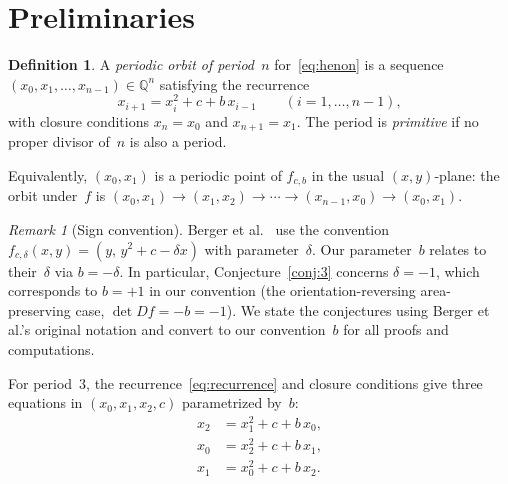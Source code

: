 \documentclass[11pt]{article}
\theoremstyle{definition}
\newtheorem{definition}[theorem]{Definition}
\theoremstyle{remark}
\newtheorem{remark}[theorem]{Remark}
\begin{document}
\section{Preliminaries}
\label{sec:prelim}

\begin{definition}\label{def:periodicorbit}
  A \emph{periodic orbit of period~$n$} for~\eqref{eq:henon} is a sequence
  $(x_0, x_1, \ldots, x_{n-1}) \in \mathbb{Q}^n$ satisfying the recurrence
  \begin{equation}\label{eq:recurrence}
    x_{i+1} = x_i^2 + c + b\, x_{i-1} \qquad (i = 1, \ldots, n-1),
  \end{equation}
  with closure conditions $x_n = x_0$ and $x_{n+1} = x_1$.
  The period is \emph{primitive} if no proper divisor of~$n$ is also a period.
\end{definition}

Equivalently, $(x_0, x_1)$ is a periodic point of $f_{c,b}$ in the usual
$(x,y)$-plane: the orbit under~$f$ is
$(x_0, x_1) \to (x_1, x_2) \to \cdots \to (x_{n-1}, x_0) \to (x_0, x_1)$.

\begin{remark}[Sign convention]\label{rem:convention}
  Berger et al.~\cite{berger2024} use the convention
  $f_{c,\delta}(x,y) = (y,\, y^2 + c - \delta x)$ with parameter~$\delta$.
  Our parameter~$b$ relates to their~$\delta$ via $b = -\delta$.
  In particular, Conjecture~\ref{conj:3} concerns $\delta = -1$, which
  corresponds to $b = +1$ in our convention (the orientation-reversing
  area-preserving case, $\det Df = -b = -1$).
  We state the conjectures using Berger et al.'s original notation
  and convert to our convention~$b$ for all proofs and computations.
\end{remark}

For period~$3$, the recurrence~\eqref{eq:recurrence} and closure conditions give
three equations in $(x_0, x_1, x_2, c)$ parametrized by~$b$:
%
\begin{align}
  x_2 &= x_1^2 + c + b\, x_0, \label{eq:p3a}\\
  x_0 &= x_2^2 + c + b\, x_1, \label{eq:p3b}\\
  x_1 &= x_0^2 + c + b\, x_2. \label{eq:p3c}
\end{align}


\end{document}
